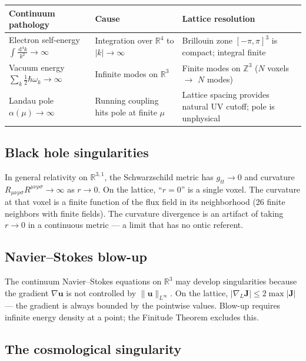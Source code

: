 \documentclass[11pt]{article}
\theoremstyle{tight}
\theoremstyle{plainroman}
\newcommand{\R}{\mathbb{R}}
\newcommand{\Z}{\mathbb{Z}}
\newcommand{\dd}{\,\mathrm{d}}
\begin{document}
\begin{center}
\renewcommand{\arraystretch}{1.25}
\begin{tabular}{p{} p{} p{}}
\toprule
\textbf{Continuum pathology} & \textbf{Cause} & \textbf{Lattice resolution} \\
\midrule
Electron self-energy $\int\frac{\dd^4 k}{k^2}\to\infty$ & Integration over $\R^4$ to $|k|\to\infty$ & Brillouin zone $[-\pi,\pi]^3$ is compact; integral finite \\
Vacuum energy $\sum_k\frac{1}{2}\hbar\omega_k\to\infty$ & Infinite modes on $\R^3$ & Finite modes on $\Z^3$ ($N$ voxels $\to$ $N$ modes) \\
Landau pole $\alpha(\mu)\to\infty$ & Running coupling hits pole at finite $\mu$ & Lattice spacing provides natural UV cutoff; pole is unphysical \\
\bottomrule
\end{tabular}
\end{center}

\subsection{Black hole singularities}

In general relativity on $\R^{3,1}$, the Schwarzschild metric has $g_{tt}\to 0$ and curvature $R_{\mu\nu\rho\sigma}R^{\mu\nu\rho\sigma}\to\infty$ as $r\to 0$.
On the lattice, ``$r=0$'' is a single voxel.
The curvature at that voxel is a finite function of the flux field in its neighborhood (26 finite neighbors with finite fields).
The curvature divergence is an artifact of taking $r\to 0$ in a continuous metric --- a limit that has no ontic referent.

\subsection{Navier--Stokes blow-up}

The continuum Navier--Stokes equations on $\R^3$ may develop singularities because the gradient $\nabla\mathbf u$ is not controlled by $\|\mathbf u\|_{L^\infty}$.
On the lattice, $|\nabla_L\mathbf J|\le 2\max|\mathbf J|$ --- the gradient is always bounded by the pointwise values.
Blow-up requires infinite energy density at a point; the Finitude Theorem excludes this.

\subsection{The cosmological singularity}
\end{document}
